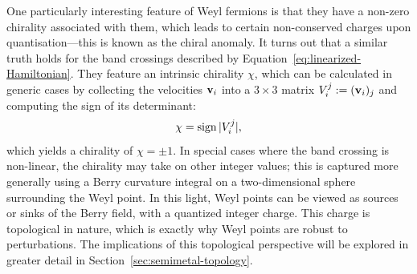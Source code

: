 One particularly interesting feature of Weyl fermions is that they have a non-zero chirality associated with them, which leads to certain non-conserved charges upon quantisation---this is known as the chiral anomaly. It turns out that a similar truth holds for the band crossings described by Equation~\eqref{eq:linearized-Hamiltonian}. They feature an intrinsic chirality $\chi$, which can be calculated in generic cases by collecting the velocities $\vb{v}_i$ into a $3\times 3$ matrix $V_i^j := (\vb{v}_i)_j$ and computing the sign of its determinant:
\begin{equation}\label{eq:determinant_chirality}
	\chi = \operatorname{sign}{|V_i^j|},
\end{equation} 
which yields a chirality of $\chi=\pm1$. In special cases where the band crossing is non-linear, the chirality may take on other integer values; this is captured more generally using a Berry curvature integral on a two-dimensional sphere surrounding the Weyl point. In this light, Weyl points can be viewed as sources or sinks of the Berry field, with a quantized integer charge. This charge is topological in nature, which is exactly why Weyl points are robust to perturbations. The implications of this topological perspective will be explored in greater detail in Section~\ref{sec:semimetal-topology}.


